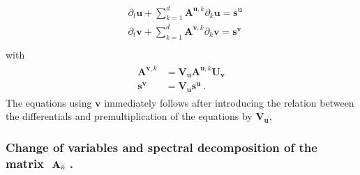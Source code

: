 \documentclass[letterpaper,10pt,english]{jupyterBook}
\begin{document}
\begin{equation*}
\begin{split}\begin{aligned}
 & \partial_t \mathbf{u} + \sum_{k=1}^{d} \mathbf{A}^{\mathbf{u}, k} \partial_k \mathbf{u} = \mathbf{s}^{\mathbf{u}} \\
 & \partial_t \mathbf{v} + \sum_{k=1}^{d} \mathbf{A}^{\mathbf{v}, k} \partial_k \mathbf{v} = \mathbf{s}^{\mathbf{v}} \\
\end{aligned}\end{split}
\end{equation*}
\sphinxAtStartPar
with
\begin{equation*}
\begin{split}\begin{aligned}
  \mathbf{A}^{\mathbf{v},k} & = \mathbf{V}_{\mathbf{u}} \mathbf{A}^{\mathbf{u},k} \mathbf{U}_{\mathbf{v}} \\
  \mathbf{s}^{\mathbf{v}}   & = \mathbf{V}_{\mathbf{u}} \mathbf{s}^{\mathbf{u}}  \ .
\end{aligned}\end{split}
\end{equation*}
\sphinxAtStartPar
The equations using \(\mathbf{v}\) immediately follows after introducing the relation between the differentials and pre\sphinxhyphen{}multiplication of the equations by \(\mathbf{V}_{\mathbf{u}}\),
\subsubsection*{Change of variables and spectral decomposition of the matrix \protect\(\ \mathbf{A}_{\hat{n}} \ \protect\).}
\end{document}
